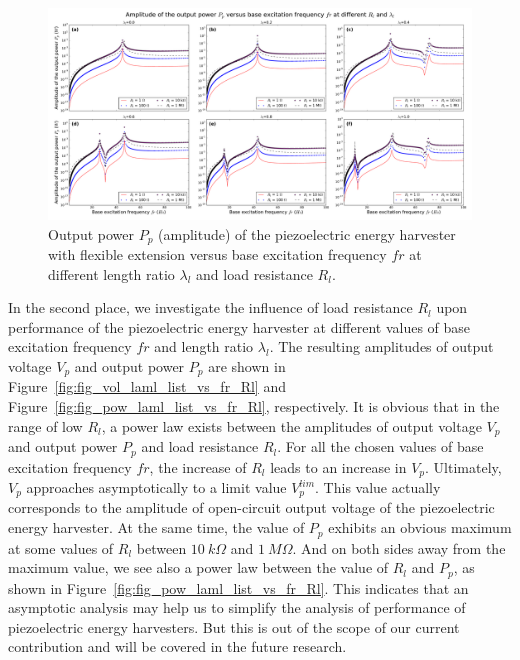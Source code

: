 \documentclass{elsarticle}
\begin{document}
\begin{figure}[!htbp]
    \centering
    \includegraphics[width=\textwidth]{./fig_output_power_vs_fr_Rl_laml_all}
    \caption{Output power $P_p$ (amplitude) of the piezoelectric energy harvester with flexible extension versus base excitation frequency $fr$ at different length ratio $\lambda_l$ and load resistance $R_l$. }
    \label{fig:fig_output_power_vs_fr_Rl_laml_all}
\end{figure}

In the second place, we investigate the influence of load resistance $R_l$ upon performance of the piezoelectric energy harvester at different values of base excitation frequency $fr$ and length ratio $\lambda_l$. The resulting amplitudes of output voltage $V_p$ and output power $P_p$ are shown in Figure~\ref{fig:fig_vol_laml_list_vs_fr_Rl} and Figure~\ref{fig:fig_pow_laml_list_vs_fr_Rl}, respectively. It is obvious that in the range of low $R_l$, a power law exists between the amplitudes of output voltage $V_p$ and output power $P_p$ and load resistance $R_l$. For all the chosen values of base excitation frequency $fr$, the increase of $R_l$ leads to an increase in $V_p$. Ultimately, $V_p$ approaches asymptotically to a limit value $V_p^{lim}$. This value actually corresponds to the amplitude of open-circuit output voltage of the piezoelectric energy harvester. At the same time, the value of $P_p$ exhibits an obvious maximum at some values of $R_l$ between $10\ k\Omega$ and $1\ M\Omega$. And on both sides away from the maximum value, we see also a power law between the value of $R_l$ and $P_p$, as shown in Figure~\ref{fig:fig_pow_laml_list_vs_fr_Rl}. This indicates that an asymptotic analysis may help us to simplify the analysis of performance of piezoelectric energy harvesters. But this is out of the scope of our current contribution and will be covered in the future research.
\end{document}
